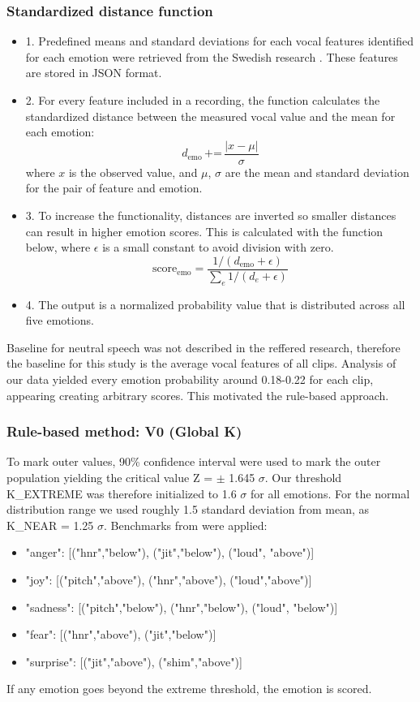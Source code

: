 \subsubsection{Standardized distance function}
\label{sec:method-stand-func}
\begin{itemize}
    \item 1. Predefined means and standard deviations for each vocal features identified for each emotion were retrieved from the Swedish research \autocite{Ekberg2023}. These features are stored in JSON format. 
    \item 2. For every feature included in a recording, the function calculates the standardized distance between the measured vocal value and the mean for each emotion: 
    \[
    d_{\text{emo}} \, \text{+=} \, \frac{|x - \mu|}{\sigma}
    \]
    where \( x \) is the observed value, and \( \mu \), \( \sigma \) are the mean and standard deviation for the pair of feature and emotion.  
    \item 3. To increase the functionality, distances are inverted so smaller distances can result in higher emotion scores. 
    This is calculated with the function below, where \( \epsilon \) is a small constant to avoid division with zero. 
    \[
    \text{score}_{\text{emo}} = \frac{1 / (d_{\text{emo}} + \epsilon)}{\sum_{e} 1 / (d_{e} + \epsilon)}
    \]
    \item 4. The output is a normalized probability value that is distributed across all five emotions. 
\end{itemize}
Baseline for neutral speech was not described in the reffered research, therefore the baseline for this study is the average vocal features of all clips. 
Analysis of our data yielded every emotion probability around 0.18-0.22 for each clip, appearing creating arbitrary scores. This motivated the rule-based approach. 

\subsubsection{Rule-based method: V0 (Global K)}

To mark outer values, 90\% confidence interval were used to mark the outer population \autocite{Bruce2017} yielding the critical value Z = $\pm$ 1.645 $\sigma$. 
Our threshold K\_EXTREME was therefore initialized to 1.6 $\sigma$ for all emotions. For the normal distribution range we used roughly 1.5 standard deviation from mean, as K\_NEAR = 1.25 $\sigma$. 
Benchmarks from \textcite{Ekberg2023} were applied: 
\begin{itemize}
    \item "anger": [("hnr","below"), ("jit","below"), ("loud", "above")]
    \item "joy": [("pitch","above"), ("hnr","above"), ("loud","above")]
    \item "sadness": [("pitch","below"), ("hnr","below"), ("loud", "below")]
    \item "fear": [("hnr","above"), ("jit","below")]
    \item "surprise": [("jit","above"), ("shim","above")]
\end{itemize}
If any emotion goes beyond the extreme threshold, the emotion is scored. 

